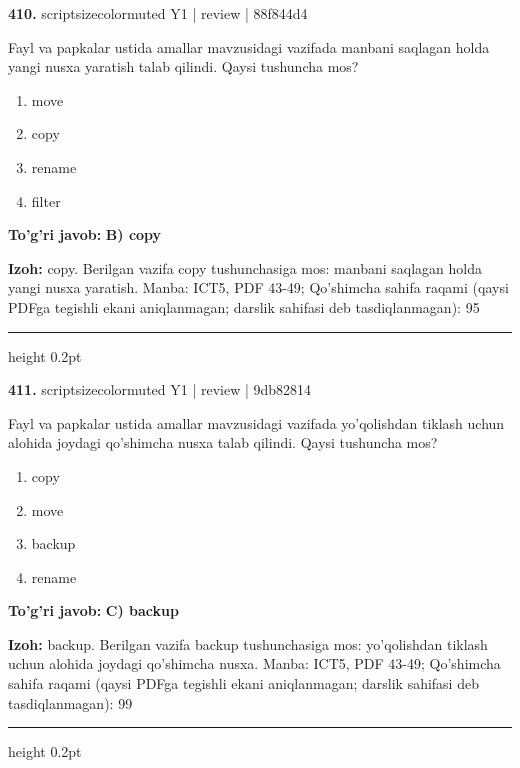\documentclass[10pt,a4paper]{article}
\begin{document}
{\bfseries\sffamily\color{ink} 410.} {scriptsizecolor{muted} Y1 | review | 88f844d4}
\par
Fayl va papkalar ustida amallar mavzusidagi vazifada manbani saqlagan holda yangi nusxa yaratish talab qilindi. Qaysi tushuncha mos?
\begin{enumerate}[label=\Alph*),leftmargin=9mm]
\item move
\item copy
\item rename
\item filter
\end{enumerate}
\begin{tcolorbox}[enhanced,breakable,colback=teal!4,colframe=teal!60!black,boxrule=0.45pt,arc=1.2mm,left=2.7mm,right=2.7mm,top=1.8mm,bottom=1.8mm,before skip=2mm,after skip=2mm]
{\bfseries\sffamily\color{teal}To'g'ri javob:} \textbf{B) copy}
\par\smallskip
{\bfseries Izoh:} copy. Berilgan vazifa copy tushunchasiga mos: manbani saqlagan holda yangi nusxa yaratish. Manba: ICT5, PDF 43-49; Qo'shimcha sahifa raqami (qaysi PDFga tegishli ekani aniqlanmagan; darslik sahifasi deb tasdiqlanmagan): 95
\end{tcolorbox}
\vspace{2mm}\hrule height 0.2pt\vspace{3mm}

{\bfseries\sffamily\color{ink} 411.} {scriptsizecolor{muted} Y1 | review | 9db82814}
\par
Fayl va papkalar ustida amallar mavzusidagi vazifada yo'qolishdan tiklash uchun alohida joydagi qo'shimcha nusxa talab qilindi. Qaysi tushuncha mos?
\begin{enumerate}[label=\Alph*),leftmargin=9mm]
\item copy
\item move
\item backup
\item rename
\end{enumerate}
\begin{tcolorbox}[enhanced,breakable,colback=teal!4,colframe=teal!60!black,boxrule=0.45pt,arc=1.2mm,left=2.7mm,right=2.7mm,top=1.8mm,bottom=1.8mm,before skip=2mm,after skip=2mm]
{\bfseries\sffamily\color{teal}To'g'ri javob:} \textbf{C) backup}
\par\smallskip
{\bfseries Izoh:} backup. Berilgan vazifa backup tushunchasiga mos: yo'qolishdan tiklash uchun alohida joydagi qo'shimcha nusxa. Manba: ICT5, PDF 43-49; Qo'shimcha sahifa raqami (qaysi PDFga tegishli ekani aniqlanmagan; darslik sahifasi deb tasdiqlanmagan): 99
\end{tcolorbox}
\vspace{2mm}\hrule height 0.2pt\vspace{3mm}
\end{document}
